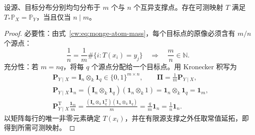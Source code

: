 \begin{theorem}[均匀离散分布的整除条件]\label{cw:thm:monge-divisibility}
设源、目标分布分别均匀分布于 $m$ 个与 $n$ 个互异支撑点。存在可测映射 $T$ 满足 $T_*\mathbb P_X=\mathbb P_Y$，当且仅当 $n\mid m$。
\end{theorem}
\begin{proof}
必要性：由式~\eqref{cw:eq:monge-atom-mass}，每个目标点的原像必须含有 $m/n$ 个源点：
\begin{equation}\label{cw:eq:monge-divisibility}
\frac1n=\frac1m\#\{i:T(x_i)=y_j\}
\quad\Longrightarrow\quad\frac mn\in\mathbb N.
\end{equation}
充分性：若 $m=nq$，将每 $q$ 个源点分配给一个目标点。用 Kronecker 积写为
\begin{equation}\label{cw:eq:monge-construction}
\begin{aligned}
&\bm P_{Y\mid X}=\bm I_n\otimes_k\mathbf1_q\in\{0,1\}^{m\times n},
\qquad\bm\Pi=\frac1m\bm P_{Y\mid X},\\
&\bm P_{Y\mid X}\mathbf1_n
=(\bm I_n\otimes_k\mathbf1_q)(\mathbf1_n\otimes_k1)
=\mathbf1_n\otimes_k\mathbf1_q=\mathbf1_m,\\
&\bm P_{Y\mid X}^{\mathrm T}\frac{\mathbf1_m}{m}
=\frac{(\bm I_n\otimes_k\mathbf1_q^{\mathrm T})(\mathbf1_n\otimes_k\mathbf1_q)}m
=\frac q m\mathbf1_n=\frac1n\mathbf1_n.
\end{aligned}
\end{equation}
以矩阵每行的唯一非零元素确定 $T(x_i)$，并在有限源支撑之外任取常值延拓，即得到所需可测映射。
\end{proof}
